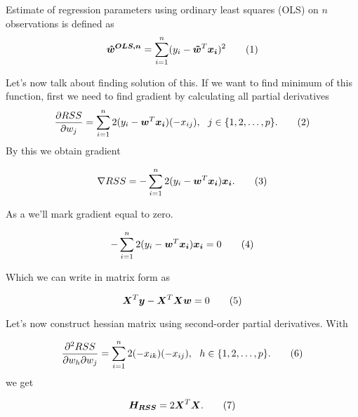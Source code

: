 \begin{definition} Estimate of regression parameters using ordinary least squares (OLS) on $n$ observations is defined as
    \begin{equation}
        \vec{\hat{w}^{OLS, n}} =  \sum\limits_{i=1}^n (y_i - \vec{\tilde{w}}^T\vec{x_i})^2 \numberthis
    \end{equation}
\end{definition}

Let's now talk about finding solution of this. If we want to find minimum of this function, first we need to find gradient by calculating all partial derivatives
\begin{equation}
    \frac{\partial {RSS} }{\partial w_j} = \sum\limits_{i=1}^n 2(y_i - \vec{w}^T\vec{x_i})(-x_{ij}) \\, \ \ j \in \{{1,2,\ldots,p\}}. \numberthis
\end{equation}
By this we obtain gradient 

\begin{equation}
    \nabla RSS = -\sum\limits_{i=1}^n 2(y_i - \vec{w}^T\vec{x_i})\vec{x_i}. \numberthis
\end{equation}

As a  we'll mark gradient equal to zero.

\begin{equation}
    -\sum\limits_{i=1}^n 2(y_i - \vec{w}^T\vec{x_i})\vec{x_i} = 0 \numberthis
\end{equation}

Which we can write in matrix form as 

\begin{equation}
    \vec{X}^T\vec{y} - \vec{X}^T\vec{X}\vec{w} = 0 \numberthis  \label{abcd}
\end{equation}


Let's now construct hessian matrix using second-order partial derivatives. With

\begin{equation}
    \frac{\partial^2{RSS} }{\partial w_h\partial w_j} = \sum\limits_{i=1}^n 2(- x_{ik})(-x_{ij}) \\, \ \ h \in \{{1,2,\ldots,p\}}. \numberthis
\end{equation}
we get 

\begin{equation}
    \vec{H_{RSS}} = 2\vec{X}^T\vec{X}. \numberthis 
\end{equation}

